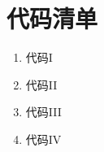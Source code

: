 \documentclass[a4paper,11pt,UTF8]{ctexart}
\begin{document}
\newpage\section{代码清单}
\begin{enumerate}
  \item 代码I
  
  
  \item 代码II
  
  
  \item 代码III
  
  
  \item 代码IV
  
  
\end{enumerate}
\end{document}
